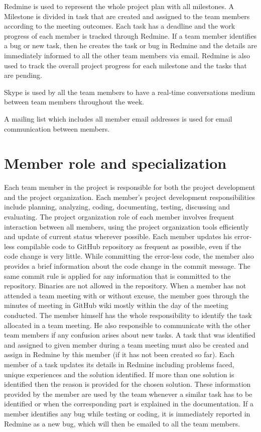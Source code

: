 Redmine is used to represent the whole project plan with all milestones.
A Milestone is divided in task that are created and assigned to the team members according to the meeting outcomes.
Each task has a deadline and the work progress of each member is tracked through Redmine.
If a team member identifies a bug or new task, then he creates the task or bug in Redmine and the details are immediately informed to all the other team members via email.
Redmine is also used to track the overall project progress for each milestone and the tasks that are pending.

Skype is used by all the team members to have a real-time conversations medium between team members throughout the week.

A mailing list which includes all member email addresses is used for email communication between members.

\section{Member role and specialization}

Each team member in the project is responsible for both the project development and the project organization.
Each member’s project development responsibilities include planning, analyzing, coding, documenting, testing, discussing and evaluating.
The project organization role of each member involves frequent interaction between all members, using
the project organization tools efficiently and update of current status wherever possible.
Each member updates his error-less compilable code to GitHub repository as frequent as possible, even if the code change is very little.
While committing the error-less code, the member also provides a brief information about the code change in the commit message.
The same commit rule is applied for any information that is committed to the repository.
Binaries are not allowed in the repository.
When a member has not attended a team meeting with or without excuse, the member
goes through the minutes of meeting in GitHub wiki mostly within the day of the meeting conducted.
The member himself has the whole responsibility to identify the task allocated in a team meeting.
He also responsible to communicate with the other team members if any confusion arises about new tasks.
A task that was identified and assigned to given member during a team meeting must also be created and assign in Redmine by this member (if it has not been created so far).
Each member of a task updates its details in Redmine including problems faced, unique experiences and the solution identified.
If more than one solution is identified then the reason is provided for the chosen solution.
These information provided by the member are used by the team whenever a similar task has to be identified or when the corresponding part is explained in the documentation.
If a member identifies any bug while testing or coding, it is immediately reported in Redmine as a new bug, which will then be emailed to all the team members.

